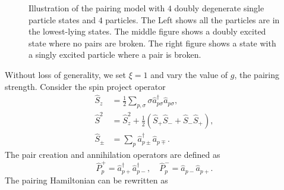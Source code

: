 \begin{figure}[ht]
	\caption{Illustration of the pairing model with $ 4 $ doubly degenerate single particle states and $ 4 $ particles. The Left shows all the particles are in the lowest-lying states. The middle figure shows a doubly excited state where no pairs are broken. The right figure shows a state with a singly excited particle where a pair is broken.}
	\label{fig:pairing-model}
\end{figure}


Without loss of generality, we set $ \xi=1 $ and vary the value of $ g $, the pairing strength. 
Consider the spin project operator 
\begin{align}
	\label{eq:spin-proj}
	\hat{S}_z & =\frac{1}{2} \sum_{p, \sigma} \sigma \hat{a}_{p \sigma}^{\dagger} \hat{a}_{p \sigma}, \\ 
	\hat{S}^2 & =\hat{S}_z^2+\frac{1}{2}\left(\hat{S}_{+} \hat{S}_{-}+\hat{S}_{-} \hat{S}_{+}\right), \\ 
	\hat{S}_{\pm} & =\sum_p \hat{a}_{p \pm}^{\dagger} \hat{a}_{p \mp}.
\end{align}
The pair creation and annihilation operators are defined as 
\begin{equation}
	\label{eq:pairingCreAnn}
	\hat{P}_p^{+}=\hat{a}_{p+}^{\dagger} \hat{a}_{p-}^{\dagger}, \quad \hat{P}_p^{-}=\hat{a}_{p-} \hat{a}_{p+}.
\end{equation}
The pairing Hamiltonian can be rewritten as 

